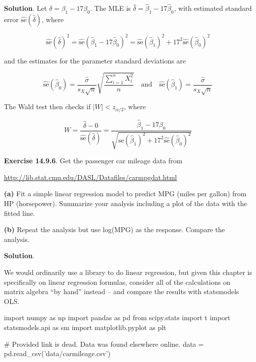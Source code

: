 \textbf{Solution}. Let \(\delta = \beta_{1} - 17 \beta_{0}\). The MLE is
\(\hat{\delta} = \hat{\beta}_{1} - 17 \hat{\beta}_{0}\), with estimated
standard error \(\hat{\text{se}}(\hat{\delta})\), where

\[\hat{\text{se}}(\hat{\delta})^{2} = \hat{\text{se}}(\hat{\beta}_{1} - 17 \hat{\beta}_{0})^{2} = \hat{\text{se}}(\hat{\beta}_{1})^{2} + 17^{2} \hat{\text{se}}(\hat{\beta}_{0})^{2} \]

and the estimates for the parameter standard deviations are

\[
\hat{\text{se}}(\hat{\beta}_{0}) = \frac{\hat{\sigma}}{s_X \sqrt{n}} \sqrt{\frac{\sum_{i=1}^{n} X_{i}^{2}}{n}}
\quad \text{and} \quad
\hat{\text{se}}(\hat{\beta}_{1}) = \frac{\hat{\sigma}}{s_X \sqrt{n}}
\]

The Wald test then checks if \(|W| < z_{\alpha / 2}\), where

\[W = \frac{\hat{\delta} - 0}{\hat{\text{se}}(\hat{\delta})} 
= \frac{\hat{\beta}_{1} - 17 \hat{\beta}_{0}}{\sqrt{\hat{\text{se}}(\hat{\beta}_{1})^{2} + 17^{2} \hat{\text{se}}(\hat{\beta}_{0})^{2}}}\]

\textbf{Exercise 14.9.6}. Get the passenger car mileage data from

\url{http://lib.stat.cmu.edu/DASL/Datafiles/carmpgdat.html}

\textbf{(a)} Fit a simple linear regression model to predict MPG (miles
per gallon) from HP (horsepower). Summarize your analysis including a
plot of the data with the fitted line.

\textbf{(b)} Repeat the analysis but use log(MPG) as the response.
Compare the analysis.

\textbf{Solution}.

We would ordinarily use a library to do linear regression, but given
this chapter is specifically on linear regression formulas, consider all
of the calculations on matrix algebra ``by hand'' instead -- and compare
the results with statsmodels OLS.

\begin{python}
import numpy as np
import pandas as pd
from scipy.stats import t
import statsmodels.api as sm
import matplotlib.pyplot as plt

# Provided link is dead.  Data was found elsewhere online.
data = pd.read_csv('data/carmileage.csv')
\end{python}

